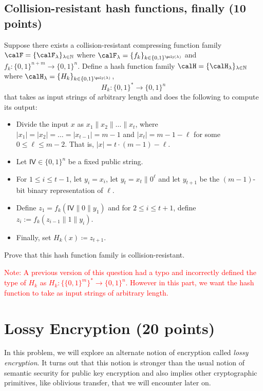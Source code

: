 \documentclass{article}
\begin{document}
\subsection{Collision-resistant hash functions, finally (10 points)}
Suppose there exists a collision-resistant compressing function family $\calF = \{\calF_\lambda\}_{\lambda \in \mathbb{N}}$ where $\calF_\lambda = \{f_k\}_{k \in \{0,1\}^{\poly(\lambda)}}$ and
$f_{k} : \{0,1\}^{n + m} \to \{0,1\}^n$. Define a hash function family $\calH = \{\calH_{\lambda}\}_{\lambda \in \mathbb{N}}$ where $\calH_{\lambda} = \{H_k\}_{k \in \{0,1\}^{\poly(\lambda)}}$, 
$$H_{k}: \{0,1\}^* \to \{0,1\}^n$$
that takes as input strings of arbitrary length and does the following to compute its output:
\begin{itemize}
  \item Divide the input $x$ as $x_1 \| x_2 \| \ldots \| x_t$, where $|x_1| = |x_2| = \ldots = |x_{t-1}| = m -1$ and $|x_t| = m -1 -\ell$ for some $0 \le \ell \le m -2$. That is, $|x| = t \cdot (m-1) - \ell$.
  \item Let \(\mathsf{IV} \in \{0,1\}^{n}\) be a fixed public string.
  \item For $1 \le i \le t - 1$, let $y_i = x_i$, let $y_t = x_t \| 0^\ell$ and let $y_{t+1}$ be the $(m - 1)$-bit binary representation of $\ell$.
  \item Define $z_1 = f_{k}(\mathsf{IV} \| 0 \| y_1)$ and for $2 \le i \le t+1$, define $z_i := f_k(z_{i-1} \| 1 \| y_{i})$.
  \item Finally, set \(H_k(x) \coloneqq z_{t+1}\).
\end{itemize}
Prove that this hash function family is collision-resistant.

\textcolor{red}{Note: A previous version of this question had a typo and incorrectly defined the type of $H_k$ as $H_k: \{\{0,1\}^m \}^* \to \{0,1\}^n$. However in this part, we want the hash function to take as input strings of arbitrary length.}

\newpage
\section{Lossy Encryption (20 points)}
In this problem, we will explore an alternate notion of encryption called \emph{lossy encryption}. It turns out that this notion is stronger than the usual notion of semantic security for public key encryption and also implies other cryptographic primitives, like oblivious transfer, that we will encounter later on.
\end{document}
